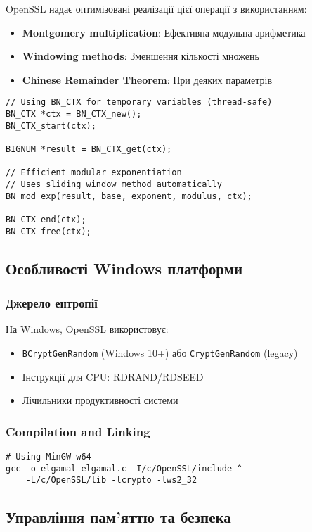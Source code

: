 OpenSSL надає оптимізовані реалізації цієї операції з використанням:
\begin{itemize}
    \item \textbf{Montgomery multiplication}: Ефективна модульна арифметика
    \item \textbf{Windowing methods}: Зменшення кількості множень
    \item \textbf{Chinese Remainder Theorem}: При деяких параметрів
\end{itemize}

\begin{verbatim}
// Using BN_CTX for temporary variables (thread-safe)
BN_CTX *ctx = BN_CTX_new();
BN_CTX_start(ctx);

BIGNUM *result = BN_CTX_get(ctx);

// Efficient modular exponentiation
// Uses sliding window method automatically
BN_mod_exp(result, base, exponent, modulus, ctx);

BN_CTX_end(ctx);
BN_CTX_free(ctx);
\end{verbatim}

\subsection{Особливості Windows платформи}

\subsubsection{Джерело ентропії}
На Windows, OpenSSL використовує:
\begin{itemize}
    \item \texttt{BCryptGenRandom} (Windows 10+) або \texttt{CryptGenRandom} (legacy)
    \item Інструкції для CPU: RDRAND/RDSEED
    \item Лічильники продуктивності системи
\end{itemize}

\subsubsection{Compilation and Linking}
\begin{verbatim}
# Using MinGW-w64
gcc -o elgamal elgamal.c -I/c/OpenSSL/include ^
    -L/c/OpenSSL/lib -lcrypto -lws2_32
\end{verbatim}

\subsection{Управління пам'яттю та безпека}

